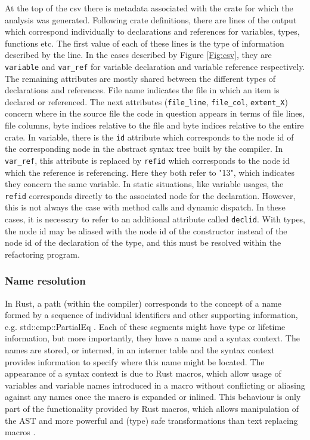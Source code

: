 At the top of the csv there is metadata associated with the crate for which the analysis was generated. Following crate definitions, there are lines of the output which correspond individually to declarations and references for variables, types, functions etc. The first value of each of these lines is the type of information described by the line. In the cases described by Figure \ref{Fig:csv}, they are {\verb|variable|} and {\verb|var_ref|} for variable declaration and variable reference respectively. The remaining attributes are mostly shared between the different types of declarations and references. File name indicates the file in which an item is declared or referenced. The next attributes ({\verb|file_line|}, {\verb|file_col|}, {\verb|extent_X|}) concern where in the source file the code in question appears in terms of file lines, file columns, byte indices relative to the file and byte indices relative to the entire crate. In variable, there is the {\verb|id|} attribute which corresponds to the node id of the corresponding node in the abstract syntax tree built by the compiler. In {\verb|var_ref|}, this attribute is replaced by {\verb|refid|} which corresponds to the node id which the reference is referencing. Here they both refer to "13", which indicates they concern the same variable. In static situations, like variable usages, the {\verb|refid|} corresponds directly to the associated node for the declaration. However, this is not always the case with method calls and dynamic dispatch. In these cases, it is necessary to refer to an additional attribute called {\verb|declid|}. With types, the node id may be aliased with the node id of the constructor instead of the node id of the declaration of the type, and this must be resolved within the refactoring program.

\subsubsection{Name resolution}
In Rust, a path (within the compiler) corresponds to the concept of a name formed by a sequence of individual identifiers and other supporting information, e.g. std::cmp::PartialEq \cite{docpath15}. Each of these segments might have type or lifetime information, but more importantly, they have a name and a syntax context. The names are stored, or interned, in an interner table and the syntax context provides information to specify where this name might be located. The appearance of a syntax context is due to Rust macros, which allow usage of variables and variable names introduced in a macro without conflicting or aliasing against any names once the macro is expanded or inlined. This behaviour is only part of the functionality provided by Rust macros, which allows manipulation of the AST and more powerful and (type) safe transformations than text replacing macros \cite{keep15}.

